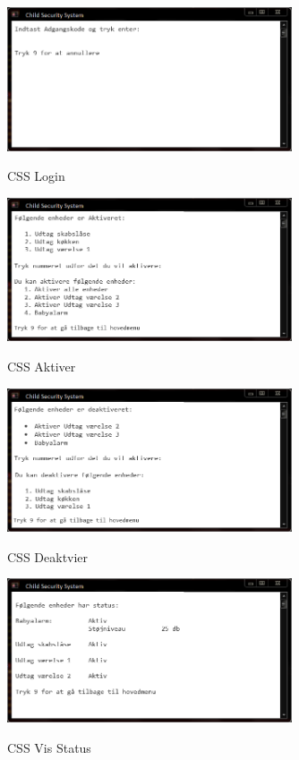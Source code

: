 \begin{figure}[h] \centering
{\includegraphics[width=0.75\textwidth]{billeder/cmdprompt/CSS_login}}
\caption{CSS Login}
\end{figure}

\begin{figure}[h] \centering
{\includegraphics[width=0.75\textwidth]{billeder/cmdprompt/CSS_aktiver}}
\caption{CSS Aktiver}
\end{figure}

\begin{figure}[h] \centering
{\includegraphics[width=0.75\textwidth]{billeder/cmdprompt/CSS_deaktiver}}
\caption{CSS Deaktvier}
\end{figure}

\begin{figure}[h] \centering
{\includegraphics[width=0.75\textwidth]{billeder/cmdprompt/CSS_vis_status}}
\caption{CSS Vis Status}
\end{figure}

